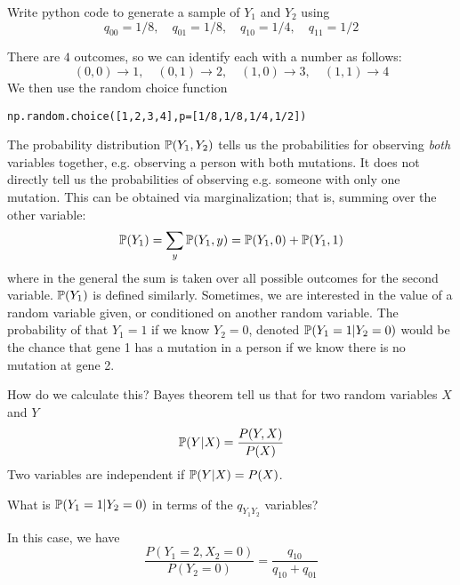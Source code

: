 \begin{example}
Write python code to generate a sample of $Y_1$ and $Y_2$ using 
\begin{equation}
q_{00} = 1/8,\quad q_{01} = 1/8,\quad q_{10} = 1/4, \quad q_{11} = 1/2
\end{equation}
\end{example}
\begin{solution}
There are $4$ outcomes, so we can identify each with a number as follows: 
\begin{equation}
(0,0) \to 1,\quad (0,1) \to 2,\quad (1,0) \to 3,\quad (1,1) \to 4
\end{equation}
We then use the random choice function
\begin{Verbatim}
np.random.choice([1,2,3,4],p=[1/8,1/8,1/4,1/2])
\end{Verbatim}
\end{solution}



The probability distribution $\mathbb P(Y_1,Y_2)$ tells us the probabilities for observing \emph{both} variables together, e.g. observing a person with both mutations. It does not directly tell us the probabilities of observing e.g. someone with only one mutation. This can be obtained via marginalization; that is, summing over the other variable:
\begin{equation}
\mathbb P(Y_1)  = \sum_{y}\mathbb P(Y_1,y) = \mathbb P(Y_1,0)  + \mathbb P(Y_1,1) 
\end{equation}
where in the general the sum is taken over all possible outcomes for the second variable. $\mathbb P(Y_1)$ is defined similarly. Sometimes, we are interested in the value of a random variable given, or {\dfn conditioned on} another random variable. The probability of that $Y_1 = 1$ if we know $Y_2 = 0$, denoted $\mathbb P(Y_1=1|Y_2=0)$ would be the chance that gene 1 has a mutation in a person if we know there is no mutation at gene 2. 

How do we calculate this? Bayes theorem tell us that for two random variables $X$ and $Y$
\begin{equation}\label{eq:bayes}
\mathbb P(Y|X) = \frac{P(Y,X)}{P(X)}
\end{equation}
Two variables are independent if $\mathbb P(Y|X)  = P(X)$. 


\begin{example}
What is $\mathbb P(Y_1=1|Y_2=0)$ in terms of the $q_{Y_1Y_2}$ variables?
\end{example}

\begin{solution}
In this case, we have 
\begin{equation}\label{eq:ex_bayes}
 \frac{P(Y_1=2,X_2=0)}{P(Y_2=0)} = \frac{q_{10}}{q_{10}+q_{01}}
\end{equation}
\end{solution}

